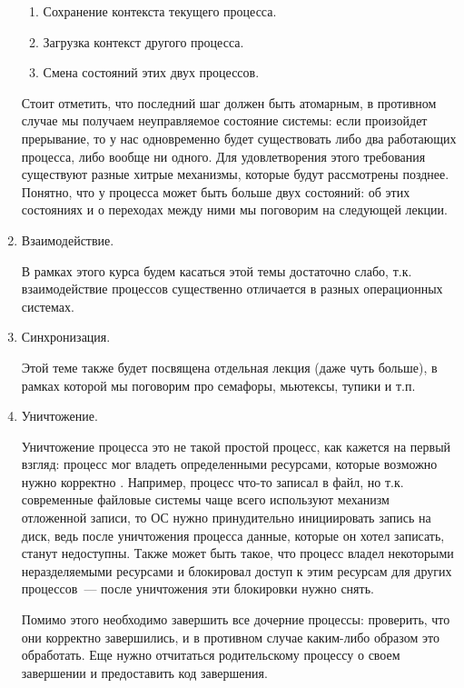 \begin{enumerate}
  \begin{enumerate}
  \item
    Сохранение контекста текущего процесса.

  \item
    Загрузка контекст другого процесса.

  \item
    Смена состояний этих двух процессов.
  \end{enumerate}

  Стоит отметить, что последний шаг должен быть атомарным, в противном случае
  мы получаем неуправляемое состояние системы: если произойдет прерывание, то
  у нас одновременно будет существовать либо два работающих процесса, либо
  вообще ни одного. Для удовлетворения этого требования существуют разные хитрые
  механизмы, которые будут рассмотрены позднее. Понятно, что у процесса может
  быть больше двух состояний: об этих состояниях и о переходах между ними мы
  поговорим на следующей лекции.

\item
  Взаимодействие.

  В рамках этого курса будем касаться этой темы достаточно слабо, т.к.
  взаимодействие процессов существенно отличается в разных операционных
  системах.

\item
  Синхронизация.

  Этой теме также будет посвящена отдельная лекция (даже чуть больше), в рамках
  которой мы поговорим про семафоры, мьютексы, тупики и т.п.

\item
  Уничтожение.

  Уничтожение процесса это не такой простой процесс, как кажется на первый
  взгляд: процесс мог владеть определенными ресурсами, которые возможно нужно
  корректно . Например, процесс что-то записал в файл, но т.к.
  современные файловые системы чаще всего используют механизм отложенной записи,
  то ОС нужно принудительно инициировать запись на диск, ведь после уничтожения
  процесса данные, которые он хотел записать, станут недоступны. Также может
  быть такое, что процесс владел некоторыми неразделяемыми ресурсами и
  блокировал доступ к этим ресурсам для других процессов~--- после уничтожения
  эти блокировки нужно снять.

  Помимо этого необходимо завершить все дочерние процессы: проверить, что они
  корректно завершились, и в противном случае каким-либо образом это обработать.
  Еще нужно отчитаться родительскому процессу о своем завершении и предоставить
  код завершения.
\end{enumerate}
